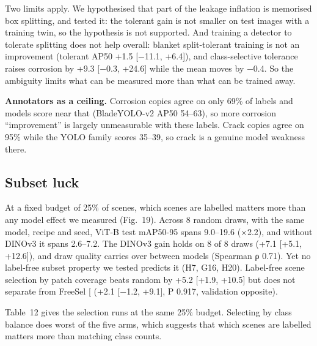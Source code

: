 \documentclass[
  10pt,
]{article}
\begin{document}
Two limits apply. We hypothesised that part of the leakage inflation is
memorised box splitting, and tested it: the tolerant gain is not smaller
on test images with a training twin, so the hypothesis is not supported.
And training a detector to tolerate splitting does not help overall:
blanket split-tolerant training is not an improvement (tolerant AP50
+1.5 {[}−11.1, +6.4{]}), and class-selective tolerance raises corrosion
by +9.3 {[}−0.3, +24.6{]} while the mean moves by −0.4. So the ambiguity
limits what can be measured more than what can be trained away.

\textbf{Annotators as a ceiling.} Corrosion copies agree on only 69\% of
labels and models score near that (BladeYOLO-v2 AP50 54--63), so more
corrosion ``improvement'' is largely unmeasurable with these labels.
Crack copies agree on 95\% while the YOLO family scores 35--39, so crack
is a genuine model weakness there.

\subsection{Subset luck}\label{subset-luck}

At a fixed budget of 25\% of scenes, which scenes are labelled matters
more than any model effect we measured (Fig.~19). Across 8 random draws,
with the same model, recipe and seed, ViT-B test mAP50-95 spans
9.0--19.6 (×2.2), and without DINOv3 it spans 2.6--7.2. The DINOv3 gain
holds on 8 of 8 draws (+7.1 {[}+5.1, +12.6{]}), and draw quality carries
over between models (Spearman ρ 0.71). Yet no label-free subset property
we tested predicts it (H7, G16, H20). Label-free scene selection by
patch coverage beats random by +5.2 {[}+1.9, +10.5{]} but does not
separate from FreeSel {[}\citeproc{ref-freesel}{30}{]} (+2.1 {[}−1.2,
+9.1{]}, P 0.917, validation opposite).

Table~12 gives the selection runs at the same 25\% budget. Selecting by
class balance does worst of the five arms, which suggests that which
scenes are labelled matters more than matching class counts.
\end{document}
